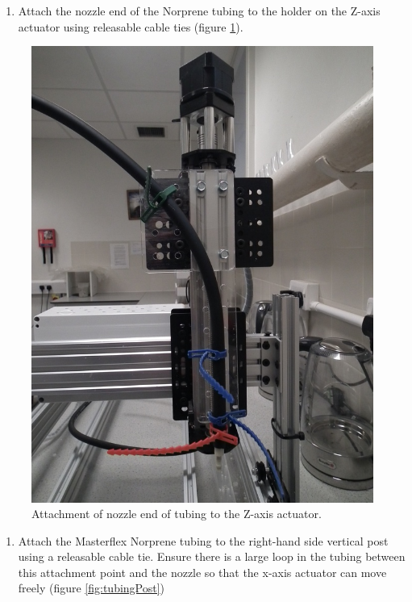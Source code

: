 \documentclass[]{book}
\providecommand{\tightlist}{%
  \setlength{\itemsep}{0pt}\setlength{\parskip}{0pt}}
\theoremstyle{definition}
\theoremstyle{definition}
\theoremstyle{remark}
\begin{document}
\begin{enumerate}
\def\labelenumi{\arabic{enumi}.}
\tightlist
\item
  Attach the nozzle end of the Norprene tubing to the holder on the
  Z-axis actuator using releasable cable ties (figure
  \ref{fig:attachNozzle}).
\end{enumerate}

\begin{figure}

{\centering \includegraphics[width=0.75\linewidth]{images/pump4} 

}

\caption{Attachment of nozzle end of tubing to the Z-axis actuator.}\label{fig:attachNozzle}
\end{figure}

\begin{enumerate}
\def\labelenumi{\arabic{enumi}.}
\setcounter{enumi}{1}
\tightlist
\item
  Attach the Masterflex Norprene tubing to the right-hand side vertical
  post using a releasable cable tie. Ensure there is a large loop in the
  tubing between this attachment point and the nozzle so that the x-axis
  actuator can move freely (figure \ref{fig:tubingPost})
\end{enumerate}
\end{document}

